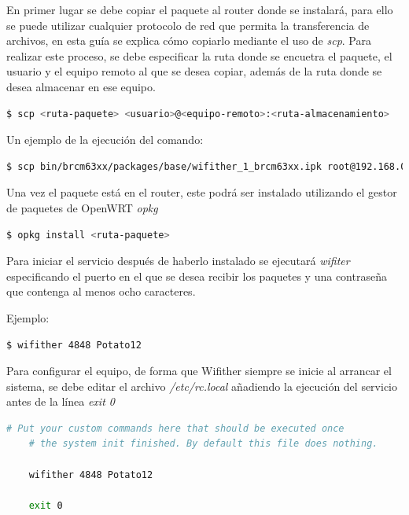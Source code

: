 \documentclass[12pt, twoside]{article}
\begin{document}
            En primer lugar se debe copiar el paquete al router donde se instalará, para ello se puede utilizar cualquier protocolo de red que permita la transferencia de archivos, en esta guía se explica cómo copiarlo mediante el uso de \textit{scp}. Para realizar este proceso, se debe especificar la ruta donde se encuetra el paquete, el usuario y el equipo remoto al que se desea copiar, además de la ruta donde se desea almacenar en ese equipo.

            \begin{lstlisting}[language=bash]
    $ scp <ruta-paquete> <usuario>@<equipo-remoto>:<ruta-almacenamiento>
            \end{lstlisting}

            Un ejemplo de la ejecución del comando:
            \begin{lstlisting}[language=bash]
    $ scp bin/brcm63xx/packages/base/wifither_1_brcm63xx.ipk root@192.168.0.4:/root/wifither
            \end{lstlisting}

            Una vez el paquete está en el router, este podrá ser instalado utilizando el gestor de paquetes de OpenWRT \textit{opkg}
            \begin{lstlisting}[language=bash]
    $ opkg install <ruta-paquete>
            \end{lstlisting}

            Para iniciar el servicio después de haberlo instalado se ejecutará \textit{wifiter} especificando el puerto en el que se desea recibir los paquetes y una contraseña que contenga al menos ocho caracteres.

            Ejemplo:
            \begin{lstlisting}[language=bash]
    $ wifither 4848 Potato12
            \end{lstlisting}

            Para configurar el equipo, de forma que Wifither siempre se inicie al arrancar el sistema, se debe editar el archivo \textit{/etc/rc.local} añadiendo la ejecución del servicio antes de la línea \textit{exit 0}

            \begin{lstlisting}[language=bash]
    # Put your custom commands here that should be executed once
    # the system init finished. By default this file does nothing.

    wifither 4848 Potato12

    exit 0
            \end{lstlisting}
\end{document}
